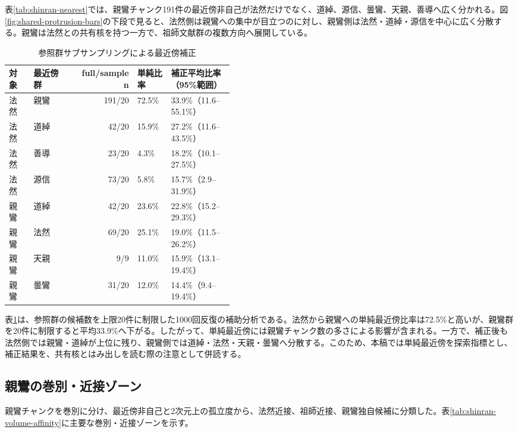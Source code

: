 \documentclass[uplatex,dvipdfmx,11pt,a4paper]{jsarticle}
\begin{document}
表\ref{tab:shinran-nearest}では、親鸞チャンク191件の最近傍非自己が法然だけでなく、道綽、源信、曇鸞、天親、善導へ広く分かれる。図\ref{fig:shared-protrusion-bars}の下段で見ると、法然側は親鸞への集中が目立つのに対し、親鸞側は法然・道綽・源信を中心に広く分散する。親鸞は法然との共有核を持つ一方で、祖師文献群の複数方向へ展開している。

\begin{table}[H]
\centering
\small
\caption{参照群サブサンプリングによる最近傍補正}
\label{tab:nearest-subsampling}
\begin{tabular}{@{}llrp{0.15\linewidth}p{0.29\linewidth}@{}}
\toprule
対象 & 最近傍群 & full/sample n & 単純比率 & 補正平均比率（95\%範囲） \\
\midrule
法然 & 親鸞 & 191/20 & 72.5\% & 33.9\%（11.6--55.1\%） \\
法然 & 道綽 & 42/20 & 15.9\% & 27.2\%（11.6--43.5\%） \\
法然 & 善導 & 23/20 & 4.3\% & 18.2\%（10.1--27.5\%） \\
法然 & 源信 & 73/20 & 5.8\% & 15.7\%（2.9--31.9\%） \\
親鸞 & 道綽 & 42/20 & 23.6\% & 22.8\%（15.2--29.3\%） \\
親鸞 & 法然 & 69/20 & 25.1\% & 19.0\%（11.5--26.2\%） \\
親鸞 & 天親 & 9/9 & 11.0\% & 15.9\%（13.1--19.4\%） \\
親鸞 & 曇鸞 & 31/20 & 12.0\% & 14.4\%（9.4--19.4\%） \\
\bottomrule
\end{tabular}
\end{table}

表\ref{tab:nearest-subsampling}は、参照群の候補数を上限20件に制限した1000回反復の補助分析である。法然から親鸞への単純最近傍比率は72.5\%と高いが、親鸞群を20件に制限すると平均33.9\%へ下がる。したがって、単純最近傍には親鸞チャンク数の多さによる影響が含まれる。一方で、補正後も法然側では親鸞・道綽が上位に残り、親鸞側では道綽・法然・天親・曇鸞へ分散する。このため、本稿では単純最近傍を探索指標とし、補正結果を、共有核とはみ出しを読む際の注意として併読する。

\subsection{親鸞の巻別・近接ゾーン}

親鸞チャンクを巻別に分け、最近傍非自己と2次元上の孤立度から、法然近接、祖師近接、親鸞独自候補に分類した。表\ref{tab:shinran-volume-affinity}に主要な巻別・近接ゾーンを示す。
\end{document}
